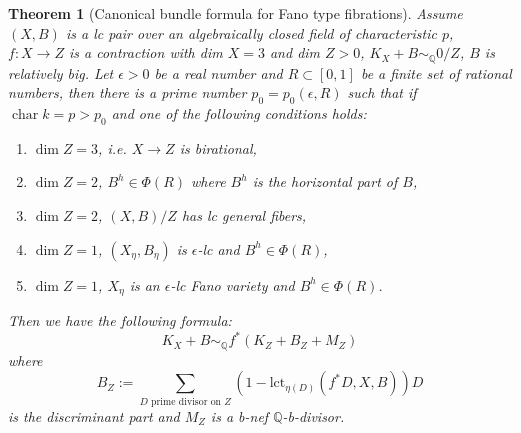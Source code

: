 \documentclass[letterpaper,reqno,12pt]{amsart}
\DeclareMathOperator{\chara}{char}
\numberwithin{equation}{section}
\theoremstyle{plain}
\newtheorem{theorem}{Theorem}[section]
\begin{document}
\begin{theorem}[Canonical bundle formula for Fano type fibrations]
\label{cbf1}
    Assume $(X,B)$ is a lc pair over an algebraically closed field of characteristic $p$, $f:X\to Z$ is a contraction with dim $X=3$ and dim $Z>0$, $K_X+B\sim_{\mathbb Q} 0/Z$, $B$ is relatively big. Let $\epsilon>0$ be a real number and $R\subset [0,1]$ be a finite set of rational numbers, then there is a prime number $p_0=p_0(\epsilon,R)$ such that if $\chara k=p>p_0$ and one of the following conditions holds:
    \begin{enumerate}
        \item $\dim Z=3$, i.e. $X\to Z$ is birational,
        \item $\dim Z=2$, $B^{h}\in\Phi(R)$ where $B^h$ is the horizontal part of $B$,
        \item $\dim Z=2$, $(X,B)/Z$ has lc general fibers,
        \item $\dim Z=1$, $(X_\eta,B_\eta)$ is $\epsilon$-lc and $B^{h}\in\Phi(R)$,
        \item $\dim Z=1$, $X_\eta$ is an $\epsilon$-lc Fano variety and $B^h\in\Phi(R)$.
    \end{enumerate}
    Then we have the following formula:
    \[K_X+B\sim_{\mathbb Q} f^*(K_Z+B_Z+M_Z)\]
    where \[B_Z:=\sum_{D\text{ prime divisor on }Z}(1-\text{lct}_{\eta(D)}(f^*D,X,B))D\]
    is the discriminant part and $M_Z$ is a b-nef ${\mathbb Q}$-b-divisor.
\end{theorem}
\end{document}
